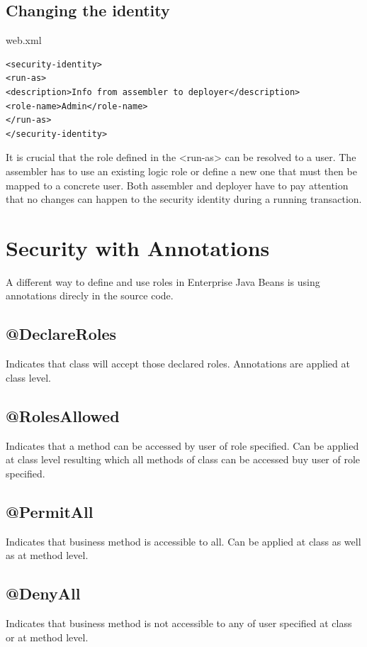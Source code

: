\documentclass[12pt,a4paper]{report}
\begin{document}
\subsection{Changing the identity}
\begin{bclogo}[couleur=yellow!15,arrondi=0.1,logo=\bccrayon, ombre = true]{web.xml}
\begin{lstlisting}[style=XML]
<security-identity>
<run-as>
<description>Info from assembler to deployer</description>
<role-name>Admin</role-name>
</run-as>
</security-identity>
\end{lstlisting}
\end{bclogo}
It is crucial that the role defined in the <run-as> can be resolved to a user. The assembler has to use an existing logic role or define a new one that must then be mapped to a concrete user.
Both assembler and deployer have to pay attention that no changes can happen to the security identity during a running transaction.

\section{Security with Annotations}
A different way to define and use roles in Enterprise Java Beans is using annotations direcly in the source code.

\subsection{@DeclareRoles}
Indicates that class will accept those declared roles. Annotations are applied at class level.

\subsection{@RolesAllowed}
Indicates that a method can be accessed by user of role specified. Can be applied at class level resulting which all methods of class can be accessed buy user of role specified. 

\subsection{@PermitAll}
Indicates that business method is accessible to all. Can be applied at class as well as at method level. 

\subsection{@DenyAll}
Indicates that business method is not accessible to any of user specified at class or at method level.
\end{document}
